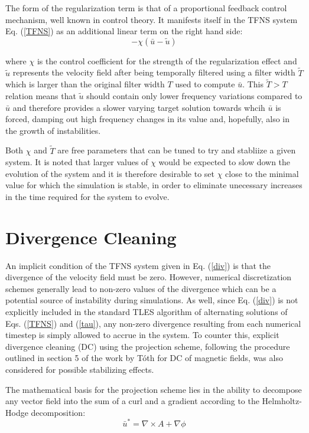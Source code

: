 The form of the regularization term is that of a proportional feedback control mechanism, well known in control theory. It manifests itself in the TFNS system Eq. (\ref{TFNS}) as an additional linear term on the right hand side:
\begin{equation}
-\chi(\bar{u}-\tilde{u})
\end{equation}

where $\chi$ is the control coefficient for the strength of the regularization effect and $\tilde{u}$ represents the velocity field after being temporally filtered using a filter width $\tilde{T}$ which is larger than the original filter width $T$ used to compute $\bar{u}$. This $\tilde{T}>T$ relation means that $\tilde{u}$ should contain only lower frequency variations compared to $\bar{u}$ and therefore provides a slower varying target solution towards whcih $\bar{u}$ is forced, damping out high frequency changes in its value and, hopefully, also in the growth of instabilities.

Both $\chi$ and $\tilde{T}$ are free parameters that can be tuned to try and stabliize a given system. It is noted that larger values of $\chi$ would be expected to slow down the evolution of the system and it is therefore desirable to set $\chi$ close to the minimal value for which the simulation is stable, in order to eliminate unecessary increases in the time required for the system to evolve.

\section{Divergence Cleaning}

An implicit condition of the TFNS system given in Eq. (\ref{div}) is that the divergence of the velocity field must be zero. However, numerical discretization schemes generally lead to non-zero values of the divergence which can be a potential source of instability during simulations. As well, since Eq. (\ref{div}) is not explicitly included in the standard TLES algorithm of alternating solutions of Eqs. (\ref{TFNS}) and (\ref{tau}), any non-zero divergence resulting from each numerical timestep is simply allowed to accrue in the system. To counter this, explicit divergence cleaning (DC) using the projection scheme, following the procedure outlined in section 5 of the work by T\'oth \cite{Toth2000} for DC of magnetic fields, was also considered for possible stabilizing effects.

The mathematical basis for the projection scheme lies in the ability to decompose any vector field into the sum of a curl and a gradient according to the Helmholtz-Hodge decomposition:
\begin{equation}
\bar{u}^*=\nabla\times A+\nabla\phi
\end{equation}

